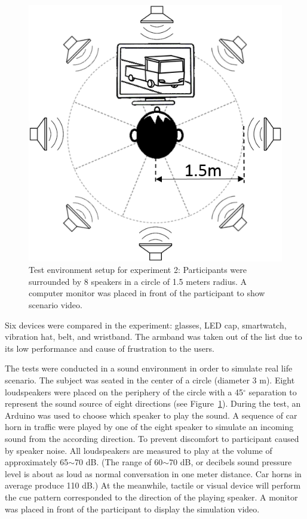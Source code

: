 \documentclass{sigchi}
\begin{document}
\begin{figure}[!t]
\centering
\includegraphics[width=0.6\columnwidth]{apparatus3}
\caption{Test environment setup for experiment 2: Participants were surrounded by 8 speakers in a circle of 1.5 meters radius. A computer monitor was placed in front of the participant to show scenario video.}
\label{fig:speakers}
\end{figure}
Six devices were compared in the experiment: glasses, LED cap, smartwatch, vibration hat, belt, and wristband. The armband was taken out of the list due to its low performance and cause of frustration to the users.

The tests were conducted in a sound environment in order to simulate real life scenario. The subject was seated in the center of a circle (diameter 3 m). Eight loudspeakers were placed on the periphery of the circle with a 45$^\circ$ separation to represent the sound source of eight directions (see Figure~\ref{fig:speakers}). During the test, an Arduino was used to choose which speaker to play the sound. A sequence of car horn in traffic were played by one of the eight speaker to simulate an incoming sound from the according direction. To prevent discomfort to participant caused by speaker noise. All loudspeakers are measured to play at the volume of approximately 65$\sim$70 dB. (The range of 60$\sim$70 dB, or decibels sound pressure level is about as loud as normal conversation in one meter distance. Car horns in average produce 110 dB.) At the meanwhile, tactile or visual device will perform the cue pattern corresponded to the direction of the playing speaker. A monitor was placed in front of the participant to display the simulation video.
\end{document}

